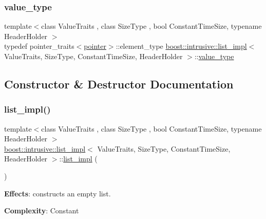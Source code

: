 \subsubsection{\texorpdfstring{value\+\_\+type}{value\_type}}
{\footnotesize\ttfamily template$<$class Value\+Traits , class Size\+Type , bool Constant\+Time\+Size, typename Header\+Holder $>$ \\
typedef pointer\+\_\+traits$<$\hyperlink{classboost_1_1intrusive_1_1list__impl_a671027d235426ed75ab9e4b2e090afe5}{pointer}$>$\+::element\+\_\+type \hyperlink{classboost_1_1intrusive_1_1list__impl}{boost\+::intrusive\+::list\+\_\+impl}$<$ Value\+Traits, Size\+Type, Constant\+Time\+Size, Header\+Holder $>$\+::\hyperlink{classboost_1_1intrusive_1_1list__impl_a011b08f2310cd73b4691870fc22e2cec}{value\+\_\+type}}



\subsection{Constructor \& Destructor Documentation}
\mbox{\label{classboost_1_1intrusive_1_1list__impl_a4700da87f6258203c4450d637eef77b3}} 
\subsubsection{\texorpdfstring{list\+\_\+impl()}{list\_impl()}\hspace{0.1cm}{\footnotesize\ttfamily [1/4]}}
{\footnotesize\ttfamily template$<$class Value\+Traits , class Size\+Type , bool Constant\+Time\+Size, typename Header\+Holder $>$ \\
\hyperlink{classboost_1_1intrusive_1_1list__impl}{boost\+::intrusive\+::list\+\_\+impl}$<$ Value\+Traits, Size\+Type, Constant\+Time\+Size, Header\+Holder $>$\+::\hyperlink{classboost_1_1intrusive_1_1list__impl}{list\+\_\+impl} (\begin{DoxyParamCaption}{ }\end{DoxyParamCaption})\hspace{0.3cm}{\ttfamily [inline]}}

{\bfseries Effects}\+: constructs an empty list.

{\bfseries Complexity}\+: Constant

